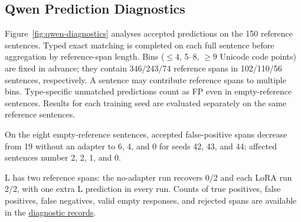 \subsection{Qwen Prediction Diagnostics}
\label{sec:qwen-diagnostics-r2}

Figure~\ref{fig:qwen-diagnostics} analyses accepted predictions on the 150 reference sentences. Typed exact matching is completed on each full sentence before aggregation by reference-span length. Bins ($\leq4$, 5--8, $\geq9$ Unicode code points) are fixed in advance; they contain 346/243/74 reference spans in 102/110/56 sentences, respectively. A sentence may contribute reference spans to multiple bins. Type-specific unmatched predictions count as FP even in empty-reference sentences. Results for each training seed are evaluated separately on the same reference sentences.

On the eight empty-reference sentences, accepted false-positive spans decrease from 19 without an adapter to 6, 4, and 0 for seeds 42, 43, and 44; affected sentences number 2, 2, 1, and 0.

L has two reference spans: the no-adapter run recovers 0/2 and each LoRA run 2/2, with one extra L prediction in every run. Counts of true positives, false positives, false negatives, valid empty responses, and rejected spans are available in the \href{https://github.com/AlfredJamesLi/chinese-skillspan-benchmark/blob/1d1c24e20ee049fc768034b5baf58fa882e08e2c/reproduction/process_archive_20260924/secondary_review/source/tex/qwen_diagnostics_round2.tex}{diagnostic records}.
